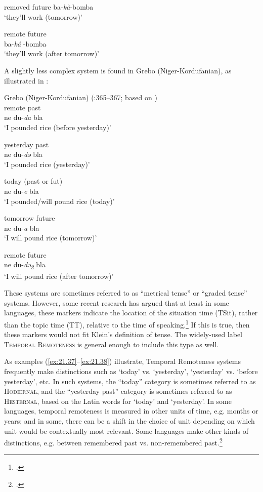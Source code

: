 \ex  removed future  
 ba-\textit{kà}-bomba  \\ 
\glt‘they’ll work (tomorrow)’

\ex  remote future   \\
ba-\textit{ká} -bomba   \\
\glt ‘they’ll work (after tomorrow)’
\z
\z

A slightly less complex system is found in Grebo (Niger-Kordufanian), as illustrated in :

\ea \label{ex:21.38} 
Grebo (Niger-Kordufanian) (\citealt{Frawley1992}:365–367; based on \citet{Innes1966}) \\
\ea  remote past \\
ne du-\textit{da} bla \\ 
\glt‘I pounded rice (before yesterday)’

\ex yesterday past\\
ne du-\textit{də} bla\\
\glt ‘I pounded rice (yesterday)’ 

\ex today (past or fut) \\
ne du-\textit{e} bla \\ 
\glt‘I pounded/will pound rice (today)’

\ex tomorrow future \\
ne du-\textit{a} bla \\
\glt‘I will pound rice (tomorrow)’

\ex remote future \\
ne du-\textit{də\textsubscript{2}} bla \\ 
\glt‘I will pound rice (after tomorrow)’
\z
\z

These systems are sometimes referred to as “metrical tense” or “graded tense” systems. However, some recent research has argued that at least in some languages, these markers indicate the location of the situation time (TSit), rather than the topic time (TT), relative to the time of speaking.\footnote{\citet{Cable2013,LaCross2016}.} If this is true, then these markers would not fit Klein’s definition of tense. The widely-used label \textsc{Temporal Remoteness} is general enough to include this type as well.



As examples (\ref{ex:21.37}--\ref{ex:21.38}) illustrate, Temporal Remoteness systems frequently make distinctions such as ‘today’ vs. ‘yesterday’, ‘yesterday’ vs. ‘before yesterday’, etc. In such systems, the “today” category is sometimes referred to as \textsc{Hodiernal}, and the “yesterday past” category is sometimes referred to as \textsc{Hesternal}, based on the Latin words for ‘today’ and ‘yesterday’. In some languages, temporal remoteness is measured in other units of time, e.g. months or years; and in some, there can be a shift in the choice of unit depending on which unit would be contextually most relevant. Some languages make other kinds of distinctions, e.g. between remembered past vs. non-remembered past.\footnote{\citet{Botne2012}.}



